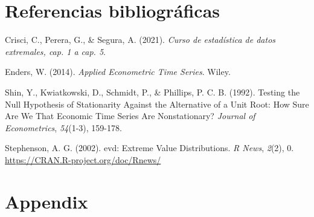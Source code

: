 \documentclass[
  12pt]{article}
\newlength{\cslhangindent}
\newenvironment{CSLReferences}[2] %
 {\begin{list}{}{%
  \setlength{\itemindent}{0pt}
  \setlength{\leftmargin}{0pt}
  \setlength{\parsep}{0pt}
  \ifodd #1
   \setlength{\leftmargin}{\cslhangindent}
   \setlength{\itemindent}{-1\cslhangindent}
  \fi
  \setlength{\itemsep}{#2\baselineskip}}}
 {\end{list}}
\begin{document}
\section{Referencias bibliográficas}

\label{refs}
\begin{CSLReferences}{1}{0}
Crisci, C., Perera, G., \& Segura, A. (2021). \emph{Curso de estadística
de datos extremales, cap. 1 a cap. 5}.

Enders, W. (2014). \emph{Applied Econometric Time Series}. Wiley.

Shin, Y., Kwiatkowski, D., Schmidt, P., \& Phillips, P. C. B. (1992).
Testing the Null Hypothesis of Stationarity Against the Alternative of a
Unit Root: How Sure Are We That Economic Time Series Are Nonstationary?
\emph{Journal of Econometrics}, \emph{54}(1-3), 159-178.

Stephenson, A. G. (2002). evd: Extreme Value Distributions. \emph{R
News}, \emph{2}(2), 0. \url{https://CRAN.R-project.org/doc/Rnews/}

\end{CSLReferences}

\newpage

\section{Appendix}\label{appendix}
\end{document}
